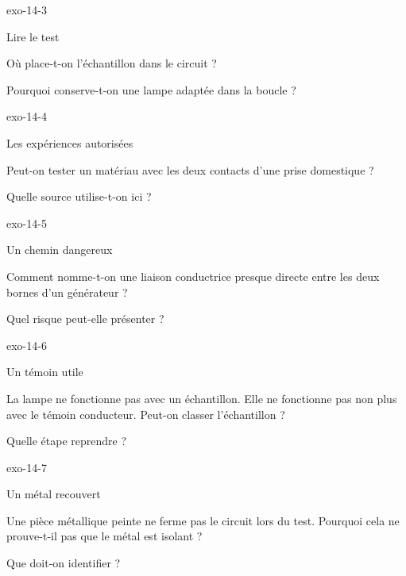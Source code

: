 \documentclass[12pt,twoside,openany]{book}
\begin{document}
\begin{blocLivre}{exo-14-3}
\begin{exercice}[1]{Lire le test}
\begin{questions}
\item Où place-t-on l’échantillon dans le circuit ?
\item Pourquoi conserve-t-on une lampe adaptée dans la boucle ?
\end{questions}
\end{exercice}\end{blocLivre}
\begin{blocLivre}{exo-14-4}
\begin{exercice}[1]{Les expériences autorisées}
\begin{questions}
\item Peut-on tester un matériau avec les deux contacts d’une prise domestique ?
\item Quelle source utilise-t-on ici ?
\end{questions}
\end{exercice}\end{blocLivre}
\begin{blocLivre}{exo-14-5}
\begin{exercice}[1]{Un chemin dangereux}
\begin{questions}
\item Comment nomme-t-on une liaison conductrice presque directe entre les deux bornes d’un générateur ?
\item Quel risque peut-elle présenter ?
\end{questions}
\end{exercice}\end{blocLivre}
\begin{blocLivre}{exo-14-6}
\begin{exercice}[2]{Un témoin utile}
\begin{questions}
\item La lampe ne fonctionne pas avec un échantillon. Elle ne fonctionne pas non plus avec le témoin conducteur. Peut-on classer l’échantillon ?
\item Quelle étape reprendre ?
\end{questions}
\end{exercice}\end{blocLivre}
\begin{blocLivre}{exo-14-7}
\begin{exercice}[2]{Un métal recouvert}
\begin{questions}
\item Une pièce métallique peinte ne ferme pas le circuit lors du test. Pourquoi cela ne prouve-t-il pas que le métal est isolant ?
\item Que doit-on identifier ?
\end{questions}
\end{exercice}\end{blocLivre}
\end{document}
